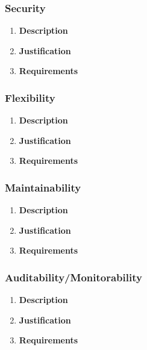 \documentclass[a4paper,10pt]{article}
\begin{document}
	\subsubsection{Security}
		\begin{enumerate}
			\item \textbf{Description} \\
			\item \textbf{Justification} \\
			\item \textbf{Requirements}\\
		\end{enumerate}

	\subsubsection{Flexibility}
		\begin{enumerate}
			\item \textbf{Description} \\
			\item \textbf{Justification} \\
			\item \textbf{Requirements}\\
		\end{enumerate}

	\subsubsection{Maintainability}
		\begin{enumerate}
			\item \textbf{Description} \\
			\item \textbf{Justification} \\
			\item \textbf{Requirements}\\
		\end{enumerate}

	\subsubsection{Auditability/Monitorability}
		\begin{enumerate}
			\item \textbf{Description} \\
			\item \textbf{Justification} \\
			\item \textbf{Requirements}\\
		\end{enumerate}
\end{document}
